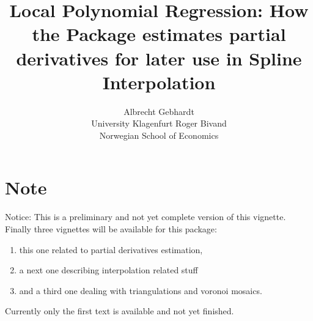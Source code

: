\documentclass[nojss]{jss}
\author{
  Albrecht Gebhardt\\ %
  University Klagenfurt
\And
  Roger Bivand\\ %
  Norwegian School of Economics}
\title{Local Polynomial Regression: How the \proglang{R} Package
  \pkg{interp} estimates partial derivatives for later use in Spline
  Interpolation}
\newcommand\rsize{%
   \fontsize{8.5pt}{9.1pt}\selectfont%
}
\begin{document}
\makeatletter
\let\Sinput\@undefined
\let\endSinput\@undefined
\let\Soutput\@undefined
\let\endSoutput\@undefined
\let\Scode\@undefined
\let\endScode\@undefined
\makeatother


%
%
%
%
%
\renewenvironment{Schunk}{\vspace{\topsep}\begin{tcolorbox}[breakable,colback=grey1]}{\end{tcolorbox}\vspace{\topsep}}
%





\section[Note]{Note}
\label{sec:note}
Notice: This is a preliminary and not yet complete version of this vignette.
Finally three vignettes will be available for this package:
\begin{enumerate}
\item this one related to partial derivatives estimation,
\item a next one describing interpolation related stuff
\item and a third one dealing with triangulations and voronoi mosaics.
\end{enumerate}
Currently only the first text is available and not yet finished.
\end{document}
